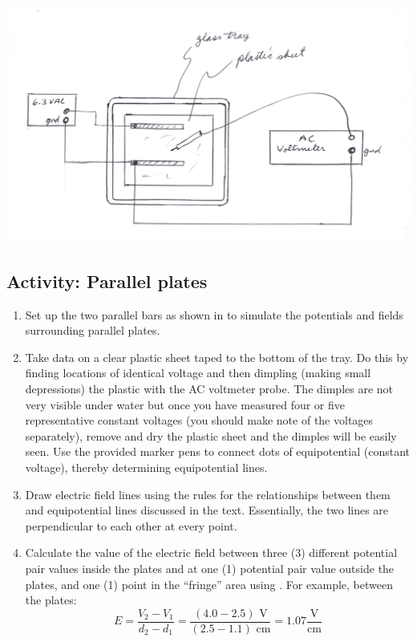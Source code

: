 \begin{multicols}{2}
\begin{center}
	\includegraphics[scale=0.5]{5bgraf/fig_1}
	\label{f:fig1}
\end{center}

\subsection{Activity: Parallel plates} %
\begin{enumerate}
	 \item Set up the two parallel bars as shown in  to simulate the potentials and fields surrounding parallel plates.
	 \item  Take data on a clear plastic sheet taped to the bottom of the tray.  Do this by finding locations of identical voltage and then dimpling (making small depressions) the plastic with the AC voltmeter probe.  
	 The dimples are not very visible under water but once you have measured four or five representative constant voltages (you should make note of the voltages separately), remove and dry the plastic sheet and the dimples will be easily seen.  
	 Use the provided marker pens to connect dots of equipotential (constant voltage), thereby determining equipotential lines.
	  \item Draw electric field lines using the rules for the relationships between them and equipotential lines discussed in the text. Essentially, the two lines are perpendicular to each other at every point.
	 \item Calculate the value of the electric field between three (3) different potential pair values inside the plates and at one (1) potential pair value outside the plates, and one (1) point in the ``fringe'' area using . For example, between the plates:\\[5pt] 
\[
	E = \frac{V_2 - V_1}{d_2 - d_1} = \frac{(4.0 - 2.5) \text{ V}}{(2.5 - 1.1)\text{ cm}}= 1.07 
	\frac{\text{V}}{\text{cm}}
\]


\end{enumerate}
\end{multicols}

